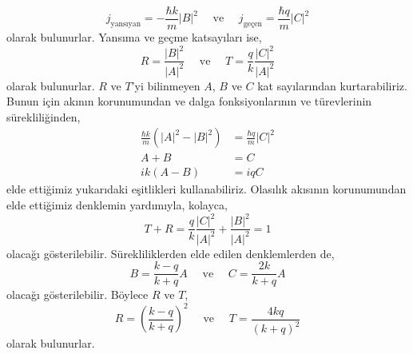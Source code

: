 \documentclass[00_kitap.tex]{subfiles}
\begin{document}
\begin{equation}
j_\text{yansıyan} =  -\frac{\hbar k}{m} |B|^2 \quad \text{ ve } \quad
j_\text{geçen} =  \frac{\hbar q}{m} |C|^2 
\end{equation}
olarak bulunurlar. Yansıma ve geçme katsayıları ise,
\begin{equation}
R =  \frac{|B|^2}{|A|^2} \quad \text{ ve } \quad
T =  \frac{q}{k} \frac{|C|^2}{|A|^2}
\end{equation}
olarak bulunurlar. $R$ ve $T$'yi bilinmeyen $A$, $B$ ve $C$ kat sayılarından
kurtarabiliriz. Bunun için akının korunumundan ve dalga fonksiyonlarının ve türevlerinin sürekliliğinden,
\begin{align}
\frac { \hbar k } { m } \left( | A | ^ { 2 }  - | B | ^ { 2 } \right) &= \frac { \hbar q } { m } | C | ^ { 2 }\\
A + B  &= C \\
i k ( A - B ) &= i q C
\end{align}
elde ettiğimiz yukarıdaki eşitlikleri kullanabiliriz. Olasılık akısının korunumundan elde ettiğimiz denklemin yardımıyla, kolayca,
\begin{equation}
T + R =  \frac{q}{k} \frac{|C|^2}{|A|^2} + \frac{|B|^2}{|A|^2} = 1
\end{equation}
olacağı gösterilebilir. Sürekliliklerden elde edilen denklemlerden de,
\begin{equation}
B =  \frac{k-q}{k+q} A \quad \text{ ve } \quad
C =  \frac{2k}{k+q} A
\end{equation}
olacağı gösterilebilir. Böylece $R$ ve $T$,
\begin{equation}
R =  \left(\frac{k-q}{k+q}\right)^2  \quad \text{ ve } \quad
T =  \frac{4kq}{(k+q)^2}
\end{equation}
olarak bulunurlar. 
\end{document}
